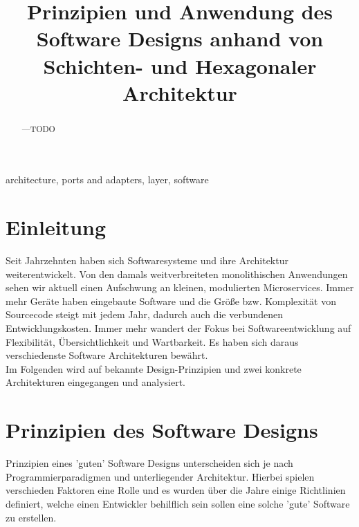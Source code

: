 \documentclass[conference]{IEEEtran}
\begin{document}

\title{Prinzipien und Anwendung des Software Designs anhand von Schichten- und Hexagonaler Architektur}

\author{
}

\maketitle


\begin{abstract}
---TODO
\end{abstract}

\begin{IEEEkeywords}
architecture, ports and adapters, layer, software
\end{IEEEkeywords}



\section{Einleitung}
Seit Jahrzehnten haben sich Softwaresysteme und ihre Architektur weiterentwickelt. Von den damals weitverbreiteten monolithischen Anwendungen sehen wir aktuell einen Aufschwung an kleinen, modulierten Microservices. Immer mehr Geräte haben eingebaute Software und die Größe bzw. Komplexität von Sourcecode steigt mit jedem Jahr, dadurch auch die verbundenen Entwicklungskosten. Immer mehr wandert der Fokus bei  Softwareentwicklung auf Flexibilität, Übersichtlichkeit und Wartbarkeit. Es haben sich daraus verschiedenste Software Architekturen bewährt. \\
Im Folgenden wird auf bekannte Design-Prinzipien und zwei konkrete Architekturen eingegangen und analysiert.



\section{Prinzipien des Software Designs}

Prinzipien eines 'guten' Software Designs unterscheiden sich je nach Programmierparadigmen und unterliegender Architektur. Hierbei spielen verschieden Faktoren eine Rolle und es wurden über die Jahre einige Richtlinien definiert, welche einen Entwickler behilflich sein sollen eine solche 'gute' Software zu erstellen.
\end{document}
